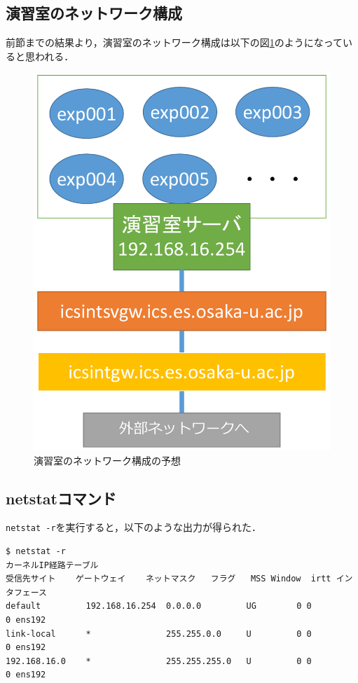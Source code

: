 \documentclass[a4j,10pt,titlepage]{jsarticle}
\begin{document}
\subsection{演習室のネットワーク構成}
前節までの結果より，演習室のネットワーク構成は以下の図\ref{fig:netstat}のようになっていると思われる．
\begin{figure}[H]
\centering
 \includegraphics[scale=0.5]{netstat_cropped.pdf}
 \caption{演習室のネットワーク構成の予想}
 \label{fig:netstat}
\end{figure}

\subsection{netstatコマンド}
\verb|netstat -r|を実行すると，以下のような出力が得られた．
\begin{verbatim}
$ netstat -r
カーネルIP経路テーブル
受信先サイト    ゲートウェイ    ネットマスク   フラグ   MSS Window  irtt インタフェース
default         192.168.16.254  0.0.0.0         UG        0 0          0 ens192
link-local      *               255.255.0.0     U         0 0          0 ens192
192.168.16.0    *               255.255.255.0   U         0 0          0 ens192
\end{verbatim}
\end{document}
